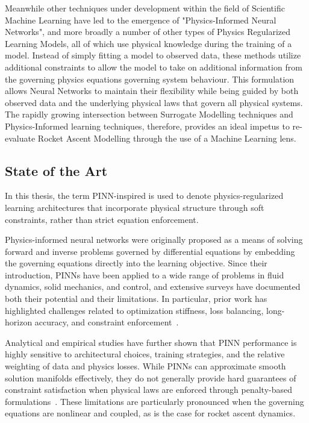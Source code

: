 Meanwhile other techniques under development within the field of Scientific Machine Learning have led to the emergence of 
"Physics-Informed Neural Networks", and more broadly a number of other types of Physics Regularized Learning Models, all of 
which use physical knowledge during the training of a model. Instead of simply fitting a model to observed data, these methods 
utilize additional constraints to allow the model to take on additional information from the governing physics equations 
governing system behaviour. This formulation allows Neural Networks to maintain their flexibility while being guided by both 
observed data and the underlying physical laws that govern all physical systems. The rapidly growing intersection between 
Surrogate Modelling techniques and Physics-Informed learning techniques, therefore, provides an ideal impetus to re-evaluate 
Rocket Ascent Modelling through the use of a Machine Learning lens.
\subsection{State of the Art}

\noindent In this thesis, the term PINN-inspired is used to denote physics-regularized learning 
architectures that incorporate physical structure through soft constraints, rather than 
strict equation enforcement.

\noindent Physics-informed neural networks were originally proposed as a means of solving forward and 
inverse problems governed by differential equations by embedding the governing equations 
directly into the learning objective. Since their introduction, PINNs have been applied to a 
wide range of problems in fluid dynamics, solid mechanics, and control, and extensive surveys 
have documented both their potential and their limitations. In particular, prior work has 
highlighted challenges related to optimization stiffness, loss balancing, long-horizon 
accuracy, and constraint enforcement~\cite{raissi2019,wang2022}.

Analytical and empirical studies have further shown that PINN performance is highly sensitive 
to architectural choices, training strategies, and the relative weighting of data and physics 
losses. While PINNs can approximate smooth solution manifolds effectively, they do not 
generally provide hard guarantees of constraint satisfaction when physical laws are 
enforced through penalty-based formulations~\cite{wang2022}. These limitations are particularly pronounced 
when the governing equations are nonlinear and coupled, as is the case for rocket ascent dynamics.

